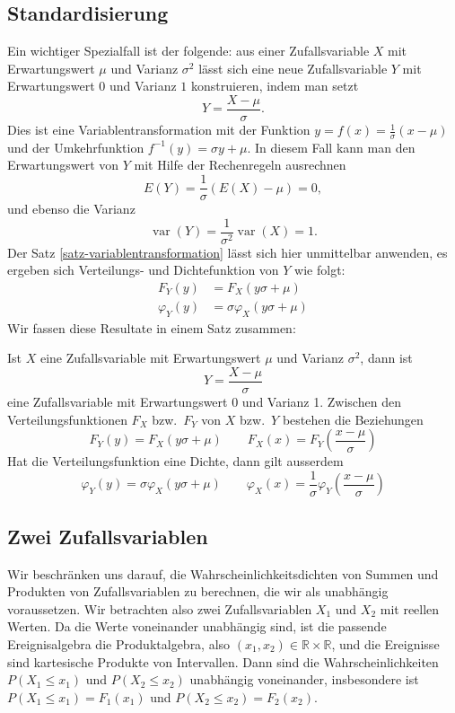 \subsection{Standardisierung} \label{section-standardisierung}
Ein wichtiger Spezialfall ist der folgende:
aus einer Zufallsvariable $X$ mit Erwartungswert
$\mu$ und Varianz $\sigma^2$ lässt sich eine neue Zufallsvariable $Y$ mit
Erwartungswert $0$ und Varianz $1$ konstruieren, indem man setzt
\[
Y=\frac{X-\mu}{\sigma}.
\]
Dies ist eine Variablentransformation mit der Funktion
$y=f(x)=\frac1\sigma(x-\mu)$ und der Umkehrfunktion $f^{-1}(y)=\sigma y+\mu$.
In diesem Fall kann man den Erwartungswert von $Y$ mit Hilfe der Rechenregeln
ausrechnen
\[
E(Y)=\frac1{\sigma}(E(X)-\mu)=0,
\]
und ebenso die Varianz
\[
\operatorname{var}(Y)=\frac1{\sigma^2}\operatorname{var}(X)=1.
\]
Der Satz \ref{satz-variablentransformation} lässt sich hier unmittelbar
anwenden, es ergeben sich Verteilungs- und Dichtefunktion von $Y$
wie folgt:
\begin{align*}
F_Y(y)&=F_X(y\sigma+\mu)\\
\varphi_Y(y)&=\sigma\varphi_X(y\sigma+\mu)
\end{align*}
Wir fassen diese Resultate in einem Satz zusammen:

\begin{satz}
\label{satz-standardisierung}
Ist $X$ eine Zufallsvariable mit Erwartungswert $\mu$ und
Varianz $\sigma^2$, dann ist
\[
Y=\frac{X-\mu}\sigma
\]
eine Zufallsvariable mit Erwartungswert 0 und Varianz 1.
Zwischen den Verteilungsfunktionen $F_X$ bzw.~$F_Y$ von $X$ bzw.~$Y$ 
bestehen die Beziehungen
\[
F_Y(y)=F_X(y\sigma+\mu)\qquad F_X(x)=F_Y\left(\frac{x-\mu}\sigma\right)
\]
Hat die Verteilungsfunktion eine Dichte, dann gilt ausserdem
\[
\varphi_Y(y)=\sigma\varphi_X(y\sigma+\mu)\qquad
\varphi_X(x)=\frac1{\sigma}\varphi_Y\left(\frac{x-\mu}\sigma\right)
\]
\end{satz}


\subsection{Zwei Zufallsvariablen}
Wir beschränken uns darauf, die Wahrscheinlichkeitsdichten von Summen
und Produkten von Zufallsvariablen zu berechnen, die wir als unabhängig
voraussetzen.
Wir betrachten also zwei Zufallsvariablen $X_1$ und $X_2$ mit reellen
Werten.
Da die Werte voneinander unabhängig sind, ist
die passende Ereignisalgebra die Produktalgebra, also
$(x_1,x_2)\in
\mathbb{R}\times\mathbb{R}$,
und die Ereignisse sind kartesische Produkte von Intervallen.
Dann sind
die Wahrscheinlichkeiten $P(X_1\le x_1)$  und $P(X_2\le x_2)$ unabhängig
voneinander, insbesondere ist $P(X_1\le x_1)=F_1(x_1)$ und
$P(X_2\le x_2)=F_2(x_2)$.

